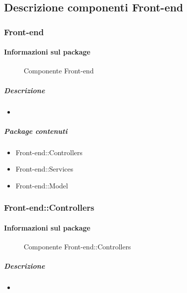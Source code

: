 \subsection{Descrizione componenti Front-end}
  \subsubsection{Front-end}
  \paragraph{Informazioni sul package} 

    \begin{figure}[H] 
      \begin{center} 
        \caption{Componente Front-end}
      \end{center}  
    \end{figure} 

  \subparagraph{Descrizione} 
    \begin{itemize}
    \item[] 
    \end{itemize} 
    \subparagraph{Package contenuti} 
    \begin{itemize}
        \item Front-end::Controllers
        \item Front-end::Services
        \item Front-end::Model
    \end{itemize}
  \subsubsection{Front-end::Controllers}
  \paragraph{Informazioni sul package} 

    \begin{figure}[H] 
      \begin{center} 
        \caption{Componente Front-end::Controllers}
      \end{center}  
    \end{figure} 

  \subparagraph{Descrizione} 
    \begin{itemize}
    \item[] 
    \end{itemize} 
